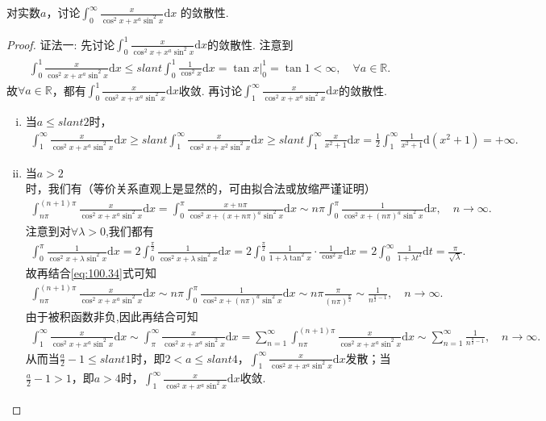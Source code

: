 \documentclass[../../main.tex]{subfiles}
\begin{document}
\begin{example}
对实数\(a\)，讨论$\int_{0}^{\infty}\frac{x}{\cos^{2}x + x^{a}\sin^{2}x}\mathrm{d}x$
的敛散性. 
\end{example}
\begin{proof}
{\color{blue}证法一:}
先讨论$\int_0^1\frac{x}{\cos^2x+x^a\sin^2x}\mathrm{d}x$的敛散性. 注意到
\begin{align*}
\int_0^1\frac{x}{\cos^2x+x^a\sin^2x}\mathrm{d}x\leqslant slant \int_0^1\frac{1}{\cos^2x}\mathrm{d}x=\tan x \Big |_{0}^{1}=\tan 1<\infty,\quad \forall a\in \mathbb{R}.
\end{align*}
故$\forall a\in \mathbb{R}$，都有$\int_0^1\frac{x}{\cos^2x+x^a\sin^2x}\mathrm{d}x$收敛.
再讨论$\int_1^{\infty}\frac{x}{\cos^2x+x^a\sin^2x}\mathrm{d}x$的敛散性.
\begin{enumerate}[(i)]
\item 当$a\leqslant slant 2$时，
\begin{align*}
\int_1^{\infty}\frac{x}{\cos^2x+x^a\sin^2x}\mathrm{d}x\geqslant slant \int_1^{\infty}\frac{x}{\cos^2x+x^2\sin^2x}\mathrm{d}x\geqslant slant \int_1^{\infty}\frac{x}{x^2+1}\mathrm{d}x=\frac{1}{2}\int_1^{\infty}\frac{1}{x^2+1}\mathrm{d}(x^2+1)=+\infty.
\end{align*}
\item 当$a>2$时，我们有（等价关系直观上是显然的，可由拟合法或放缩严谨证明）
\begin{align}
\int_{n\pi}^{(n+1)\pi}\frac{x}{\cos^2x+x^a\sin^2x}\mathrm{d}x=\int_0^{\pi}\frac{x+n\pi}{\cos^2x+(x+n\pi)^a\sin^2x}\mathrm{d}x\sim n\pi \int_0^{\pi}\frac{1}{\cos^2x+(n\pi)^a\sin^2x}\mathrm{d}x,\quad n\rightarrow \infty.\label{eq:100.34}
\end{align}
注意到对$\forall \lambda >0$,我们都有
\begin{align*}
\int_0^{\pi}\frac{1}{\cos^2x+\lambda \sin^2x}\mathrm{d}x=2\int_0^{\frac{\pi}{2}}\frac{1}{\cos^2x+\lambda \sin^2x}\mathrm{d}x=2\int_0^{\frac{\pi}{2}}\frac{1}{1+\lambda \tan^2x}\cdot \frac{1}{\cos^2x}\mathrm{d}x=2\int_0^{\infty}\frac{1}{1+\lambda t^2}\mathrm{d}t=\frac{\pi}{\sqrt{\lambda}}.
\end{align*}
故再结合\eqref{eq:100.34}式可知
\begin{align*}
\int_{n\pi}^{(n+1)\pi}\frac{x}{\cos^2x+x^a\sin^2x}\mathrm{d}x\sim n\pi \int_0^{\pi}\frac{1}{\cos^2x+(n\pi)^a\sin^2x}\mathrm{d}x\sim n\pi \frac{\pi}{(n\pi)^{\frac{a}{2}}}\sim \frac{1}{n^{\frac{a}{2}-1}},\quad n\rightarrow \infty.
\end{align*}
由于被积函数非负,因此再结合可知
\begin{align*}
\int_1^{\infty}\frac{x}{\cos^2x+x^a\sin^2x}\mathrm{d}x\sim \int_{\pi}^{\infty}\frac{x}{\cos^2x+x^a\sin^2x}\mathrm{d}x=\sum_{n=1}^{\infty}\int_{n\pi}^{(n+1)\pi}\frac{x}{\cos^2x+x^a\sin^2x}\mathrm{d}x\sim \sum_{n=1}^{\infty}\frac{1}{n^{\frac{a}{2}-1}},\quad n\rightarrow \infty.
\end{align*}
从而当$\frac{a}{2}-1\leqslant slant 1$时，即$2<a\leqslant slant 4$，$\int_1^{\infty}\frac{x}{\cos^2x+x^a\sin^2x}\mathrm{d}x$发散；当$\frac{a}{2}-1>1$，即$a>4$时，$\int_1^{\infty}\frac{x}{\cos^2x+x^a\sin^2x}\mathrm{d}x$收敛.
\end{enumerate}


\end{proof}
\end{document}
